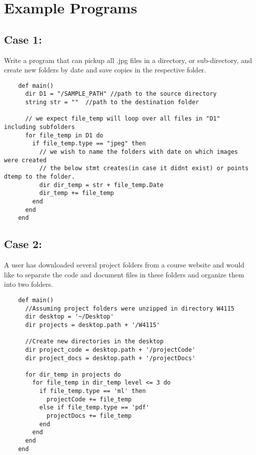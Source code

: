 \documentclass[11pt]{article}
\begin{document}
\newpage
\section{Example Programs}\label{results}
\subsection{Case 1:}
Write a program that can pickup all .jpg files in a directory, or sub-directory, and create new folders by date and save copies in the respective folder.
\begin{listing}[H]
  \begin{verbatim}
    def main()
      dir D1 = "/SAMPLE_PATH" //path to the source directory
      string str = ""  //path to the destination folder

      // we expect file_temp will loop over all files in "D1" including subfolders
      for file_temp in D1 do
        if file_temp.type == "jpeg" then
          // we wish to name the folders with date on which images were created
          // the below stmt creates(in case it didnt exist) or points dtemp to the folder.
          dir dir_temp = str + file_temp.Date
          dir_temp += file_temp
        end
      end
    end
  \end{verbatim}
\end{listing}

\subsection{Case 2:}
A user has downloaded several project folders from a course website and would like to separate the code and document files in these folders and organize them into two folders.
\begin{listing}[H]
  \begin{verbatim}
    def main()
      //Assuming project folders were unzipped in directory W4115
      dir desktop = '~/Desktop'
      dir projects = desktop.path + '/W4115'

      //Create new directories in the desktop
      dir project_code = desktop.path + '/projectCode'
      dir project_docs = desktop.path + '/projectDocs'

      for dir_temp in projects do
        for file_temp in dir_temp level <= 3 do
          if file_temp.type == 'ml' then
            projectCode += file_temp
          else if file_temp.type == 'pdf'
            projectDocs += file_temp
          end
        end
      end
    end
  \end{verbatim}
\end{listing}
\end{document}
